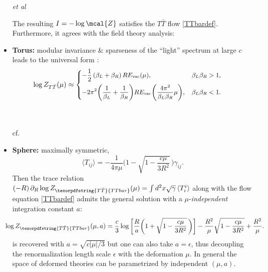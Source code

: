 \documentclass[10pt]{article}
\newcommand{\citations}[1]{{\footnotesize#1\par}}
\newcommand{\TTbar}{\texorpdfstring{\ensuremath{T\bar{T}}}{TTbar}\xspace}
\begin{document}
\begin{multicols}{3}
\begin{itemize}
	\hfill{\footnotesize \textcite{Henningson:1998gx} \textit{et al}}

The resulting $I = -\log \mcal{Z}$ satisfies the \TTbar flow \eqref{TTbardef}.\\
Furthermore, it agrees with the field theory analysis:

\item \textbf{Torus:} {modular invariance} \& sparseness of the ``light'' spectrum at large $c$ leads to the universal form :
	\begin{equation*}\small
	\hspace{-1.5em}
		\log   Z_{T\bar T}(\mu)  \approx \left\{ \begin{aligned}
		& {-\frac{1}{2}}\,(\beta_L + \beta_R)\, RE_{\text{vac}}(\mu),  &\beta_L \beta_R > 1, \\
		& {-2 \pi^2 \bigg(\frac{1}{\beta_L} + \frac{1}{\beta_R}\bigg)  RE_{\text{vac}}\bigg(\frac{4\pi^2}{\beta_L \beta_R} \mu \bigg)},  &\beta_L\beta_R < 1. %
		 \end{aligned} \right. %
	\end{equation*}
	\citations{\noindent%
		\textcite{Datta:2018thy}\\
		\textcite{Apolo:2023aho}\\
		cf.~\textcite{Hartman:2014oaa}
	}

\item \textbf{Sphere:} maximally symmetric,\\ \mbox{\footnotesize \textcite{Donnelly:2018bef}}
	\begin{equation}
		\langle T_{ij}\rangle = -\frac{1}{4\pi\mu} \bigg(1-\sqrt{1-\frac{c\mu}{3R^2}}\, \bigg)  \gamma_{ij}.
	\end{equation}
Then the trace relation \mbox{$
(-R)\,\partial_R \log Z_{\TTbar}(\mu)=\int d^2x\sqrt{\gamma}\,\langle T^i_i \rangle
$} along with the flow equation \eqref{TTbardef} 
admits the general \mbox{solution} with a $\mu$-\textit{independent} integration constant $a$:
	\begin{equation*}\small
	\hspace{-1.2em}
		\log Z_{\TTbar}(\mu, a) = \frac{c}{3} \log \bigg[\frac{R}{a}   \bigg(1+\sqrt{1-\frac{c \mu }{3  R^2}}\, \bigg) \bigg] - \frac{R^2}{\mu}  \sqrt{1-\frac{c \mu }{3 R^2}} + \frac{R^2}{\mu}. %
	\end{equation*}
	\cite{Donnelly:2018bef} is recovered with $a = \sqrt{c|\mu|/3}$ but one can also take $a = \epsilon$, thus decoupling the renormalization length scale $\epsilon$ with the deformation $\mu$. In general the space of deformed theories can be parametrized by independent $(\mu,a)$.


\end{itemize}
\end{multicols}
\end{document}
